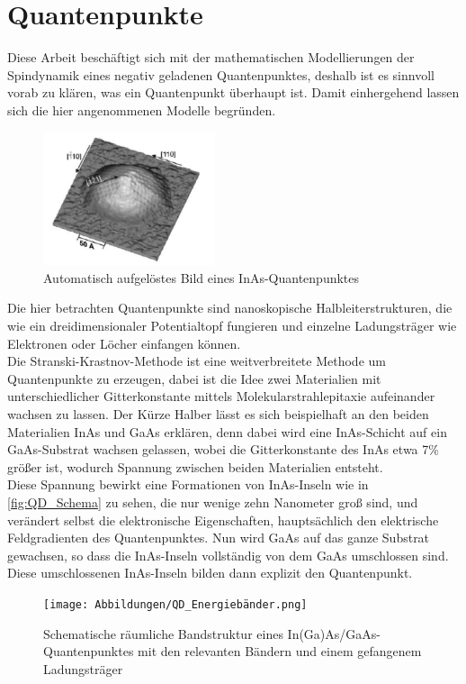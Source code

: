 \chapter{Quantenpunkte}

\noindent Diese Arbeit beschäftigt sich mit der mathematischen Modellierungen der Spindynamik eines negativ geladenen
Quantenpunktes, deshalb ist es sinnvoll vorab zu klären, was ein Quantenpunkt überhaupt ist. Damit einhergehend lassen sich die hier angenommenen Modelle begründen.\\
\begin{figure}[h!]
    \centering
    \includegraphics[width = 0.45\textwidth]{Abbildungen/einQD.png}
    \caption{Automatisch aufgelöstes Bild eines InAs-Quantenpunktes\cite{doi:10.1063/1.1365101}}
    \label{fig:QD_Schema}
\end{figure}

\noindent Die hier betrachten Quantenpunkte sind nanoskopische Halbleiterstrukturen, die wie ein dreidimensionaler Potentialtopf fungieren
und einzelne Ladungsträger wie Elektronen oder Löcher einfangen können.\\
Die Stranski-Krastnov-Methode ist eine weitverbreitete Methode um Quantenpunkte zu erzeugen, dabei ist die Idee zwei Materialien mit 
unterschiedlicher Gitterkonstante mittels Molekularstrahlepitaxie aufeinander wachsen zu lassen. Der Kürze Halber lässt es sich 
beispielhaft an den beiden Materialien InAs und GaAs erklären, denn dabei wird eine InAs-Schicht auf ein GaAs-Substrat wachsen gelassen, 
wobei die Gitterkonstante des InAs etwa 7\% größer ist, wodurch Spannung zwischen beiden Materialien entsteht. \\
\noindent Diese Spannung bewirkt eine Formationen von InAs-Inseln wie in \autoref{fig:QD_Schema} zu sehen, die nur wenige zehn 
Nanometer groß sind, und verändert selbst die elektronische Eigenschaften, hauptsächlich den elektrische Feldgradienten des 
Quantenpunktes. Nun wird GaAs auf das ganze Substrat gewachsen, so dass die InAs-Inseln vollständig von 
dem GaAs umschlossen sind. Diese umschlossenen InAs-Inseln bilden dann explizit den Quantenpunkt.\\
\begin{figure}
   \centering
    \texttt{[image: Abbildungen/QD\_Energiebänder.png]}
    \caption{Schematische räumliche Bandstruktur eines In(Ga)As/GaAs-Quantenpunktes mit den relevanten Bändern und einem 
    gefangenem Ladungsträger}
    \label{fig:QD_Bandstruktur}
\end{figure}

